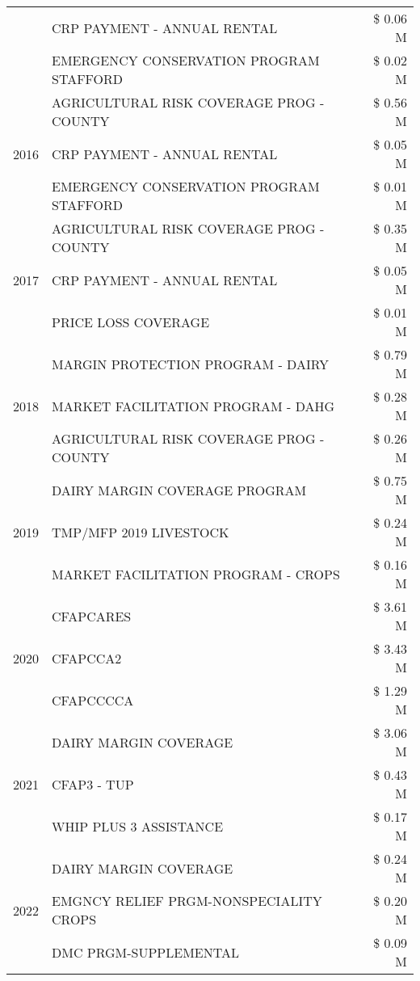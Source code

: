 \begin{tabular}{llr}
 & CRP PAYMENT - ANNUAL RENTAL & \$ 0.06 M \\
 & EMERGENCY CONSERVATION PROGRAM STAFFORD & \$ 0.02 M \\
\cline{1-3}
\multirow[t]{3}{*}{2016} & AGRICULTURAL RISK COVERAGE PROG - COUNTY & \$ 0.56 M \\
 & CRP PAYMENT - ANNUAL RENTAL & \$ 0.05 M \\
 & EMERGENCY CONSERVATION PROGRAM STAFFORD & \$ 0.01 M \\
\cline{1-3}
\multirow[t]{3}{*}{2017} & AGRICULTURAL RISK COVERAGE PROG - COUNTY & \$ 0.35 M \\
 & CRP PAYMENT - ANNUAL RENTAL & \$ 0.05 M \\
 & PRICE LOSS COVERAGE & \$ 0.01 M \\
\cline{1-3}
\multirow[t]{3}{*}{2018} & MARGIN PROTECTION PROGRAM - DAIRY & \$ 0.79 M \\
 & MARKET FACILITATION PROGRAM - DAHG & \$ 0.28 M \\
 & AGRICULTURAL RISK COVERAGE PROG - COUNTY & \$ 0.26 M \\
\cline{1-3}
\multirow[t]{3}{*}{2019} & DAIRY MARGIN COVERAGE PROGRAM & \$ 0.75 M \\
 & TMP/MFP 2019 LIVESTOCK & \$ 0.24 M \\
 & MARKET FACILITATION PROGRAM - CROPS & \$ 0.16 M \\
\cline{1-3}
\multirow[t]{3}{*}{2020} & CFAPCARES & \$ 3.61 M \\
 & CFAPCCA2 & \$ 3.43 M \\
 & CFAPCCCCA & \$ 1.29 M \\
\cline{1-3}
\multirow[t]{3}{*}{2021} & DAIRY MARGIN COVERAGE & \$ 3.06 M \\
 & CFAP3 - TUP & \$ 0.43 M \\
 & WHIP PLUS 3 ASSISTANCE & \$ 0.17 M \\
\cline{1-3}
\multirow[t]{3}{*}{2022} & DAIRY MARGIN COVERAGE & \$ 0.24 M \\
 & EMGNCY RELIEF PRGM-NONSPECIALITY CROPS & \$ 0.20 M \\
 & DMC PRGM-SUPPLEMENTAL & \$ 0.09 M \\
\cline{1-3}
\bottomrule
\end{tabular}
